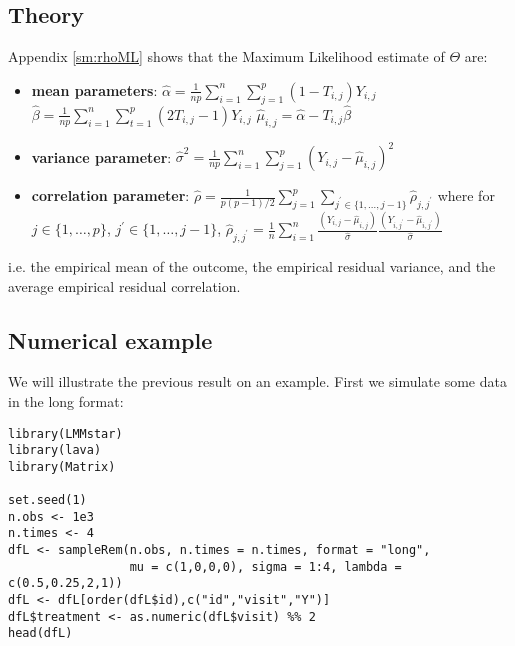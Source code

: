 \documentclass[12pt]{article}
\begin{document}
\subsection{Theory}
\label{sec:orgda95cf0}

Appendix \ref{sm:rhoML} shows that the Maximum Likelihood estimate of \(\Theta\) are:
\begin{itemize}
\item \textbf{mean parameters}: \(\widehat{\alpha}= \frac{1}{np} \sum_{i=1}^n
  \sum_{j=1}^p (1-T_{i,j}) Y_{i,j}\) \newline
{} \(\widehat{\beta}=
  \frac{1}{np} \sum_{i=1}^n \sum_{t=1}^p (2 T_{i,j}-1) Y_{i,j}\) \newline
{} \(\widehat{\mu}_{i,j} = \widehat{\alpha} - T_{i,j}\widehat{\beta}\)
\item \textbf{variance parameter}: \(\widehat{\sigma}^2 =
  \frac{1}{np}\sum_{i=1}^n\sum_{j=1}^p (Y_{i,j}-\widehat{\mu}_{i,j})^2\)
\item \textbf{correlation parameter}: \(\widehat{\rho} =
  \frac{1}{p(p-1)/2}\sum_{j=1}^p \sum_{j^{\prime} \in
  \{1,\ldots,j-1\}}\widehat{\rho}_{j,j^{\prime}}\) \newline where for
\(j \in \{1,\ldots,p\}\), \(j^{\prime} \in \{1,\ldots,j-1\}\),
\(\widehat{\rho}_{j,j^{\prime}} = \frac{1}{n}\sum_{i=1}^n
  \frac{(Y_{i,j}-\widehat{\mu}_{i,j})}{\widehat{\sigma}}\frac{(Y_{i,j^{\prime}}-\widehat{\mu}_{i,j^{\prime}})}{\widehat{\sigma}}\)
\end{itemize}
i.e. the empirical mean of the outcome, the empirical residual
variance, and the average empirical residual correlation.

\subsection{Numerical example}
\label{sec:org159d14d}

We will illustrate the previous result on an example. First we
simulate some data in the long format:
\lstset{language=r,label= ,caption= ,captionpos=b,numbers=none}
\begin{lstlisting}
library(LMMstar)
library(lava)
library(Matrix)

set.seed(1)
n.obs <- 1e3
n.times <- 4
dfL <- sampleRem(n.obs, n.times = n.times, format = "long",
                 mu = c(1,0,0,0), sigma = 1:4, lambda = c(0.5,0.25,2,1))
dfL <- dfL[order(dfL$id),c("id","visit","Y")]
dfL$treatment <- as.numeric(dfL$visit) %% 2
head(dfL)
\end{lstlisting}
\end{document}
